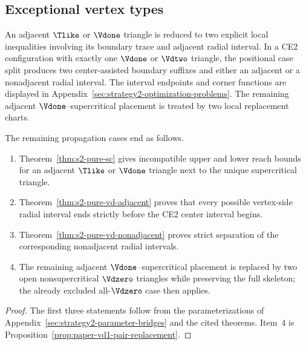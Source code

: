 \subsection{Exceptional vertex types}

\begin{definition}
\label{def:body-adjacent-rescuer-data}
\label{def:body-vd-residual-data}
\label{def:body-vd-replacement-data}
An adjacent $\Tlike$ or $\Vdone$ triangle is reduced to two explicit local
inequalities involving its boundary trace and adjacent radial interval.  In a
CE2 configuration with exactly one $\Vdone$ or $\Vdtwo$ triangle, the
positional case split produces two center-assisted boundary suffixes and
either an adjacent or a nonadjacent radial interval.  The interval endpoints
and corner functions are displayed in
Appendix~\ref{sec:strategy2-optimization-problems}.  The remaining adjacent
$\Vdone$--supercritical placement is treated by two local replacement charts.
\end{definition}

\begin{proposition}
\label{prop:body-special-terminal-certificates}
The remaining propagation cases end as follows.
\begin{enumerate}
\item Theorem~\ref{thm:s2-pure-sc} gives incompatible upper and lower reach
bounds for an adjacent $\Tlike$ or $\Vdone$ triangle next to the unique
supercritical triangle.
\item Theorem~\ref{thm:s2-pure-vd-adjacent} proves that every possible
vertex-side radial interval ends strictly before the CE2 center interval
begins.
\item Theorem~\ref{thm:s2-pure-vd-nonadjacent} proves strict separation of the
corresponding nonadjacent radial intervals.
\item The remaining adjacent $\Vdone$--supercritical placement is replaced by
two open nonsupercritical $\Vdzero$ triangles while preserving the full
skeleton; the already excluded all-$\Vdzero$ case then applies.
\end{enumerate}
\end{proposition}

\begin{proof}
The first three statements follow from the parameterizations of
Appendix~\ref{sec:strategy2-parameter-bridges} and the cited theorems.  Item~4
is Proposition~\ref{prop:paper-vd1-pair-replacement}.
\end{proof}

